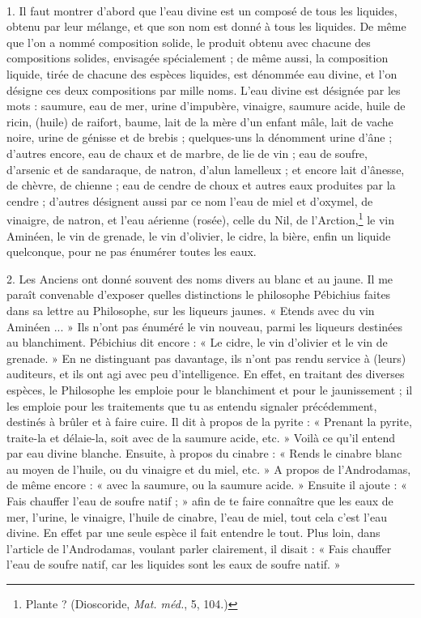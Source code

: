 \documentclass[landscape, a4paper, 11pt, oneside, polutonikogreek, french]{article}
\begin{document}
\paragraph{}
1. Il faut montrer d'abord que l'eau divine est un composé de tous les liquides, obtenu par leur mélange, et que son nom est donné à tous les liquides. De même que l'on a nommé composition solide, le produit obtenu avec chacune des compositions solides, envisagée spécialement ; de même aussi, la composition liquide, tirée de chacune des espèces liquides, est dénommée eau divine, et l'on désigne ces deux compositions par mille noms. L'eau divine est désignée par les mots : saumure, eau de mer, urine d'impubère, vinaigre, saumure acide, huile de ricin, (huile) de raifort, baume, lait de la mère d'un enfant mâle, lait de vache noire, urine de génisse et de brebis ; quelques-uns la dénomment urine d'âne ; d'autres encore, eau de chaux et de marbre, de lie de vin ; eau de soufre, d'arsenic et de sandaraque, de natron, d'alun lamelleux ; et encore lait d'ânesse, de chèvre, de chienne ; eau de cendre de choux et autres eaux produites par la cendre ; d'autres désignent aussi par ce nom l'eau de miel et d'oxymel, de vinaigre, de natron, et l'eau aérienne (rosée), celle du Nil, de l'Arction,\footnote{Plante ? (Dioscoride, \emph{Mat. méd.}, 5, 104.)} le vin Aminéen, le vin de grenade, le vin d'olivier, le cidre, la bière, enfin un liquide quelconque, pour ne pas énumérer toutes les eaux.

2. Les Anciens ont donné souvent des noms divers au blanc et au jaune. Il me paraît convenable d'exposer quelles distinctions le philosophe Pébichius faites dans sa lettre au Philosophe, sur les liqueurs jaunes. « Etends avec du vin Aminéen ... » Ils n'ont pas énuméré le vin nouveau, parmi les liqueurs destinées au blanchiment. Pébichius dit encore : « Le cidre, le vin d'olivier et le vin de grenade. » En ne distinguant pas davantage, ils n'ont pas rendu service à (leurs) auditeurs, et ils ont agi avec peu d'intelligence. En effet, en traitant des diverses espèces, le Philosophe les emploie pour le blanchiment et pour le jaunissement ; il les emploie pour les traitements que tu as entendu signaler précédemment, destinés à brûler et à faire cuire. Il dit à propos de la pyrite : « Prenant la pyrite, traite-la et délaie-la, soit avec de la saumure acide, etc. » Voilà ce qu'il entend par eau divine blanche. Ensuite, à propos du cinabre : « Rends le cinabre blanc au moyen de l'huile, ou du vinaigre et du miel, etc. » A propos de l'Androdamas, de même encore : « avec la saumure, ou la saumure acide. » Ensuite il ajoute : « Fais chauffer l'eau de soufre natif ; » afin de te faire connaître que les eaux de mer, l'urine, le vinaigre, l'huile de cinabre, l'eau de miel, tout cela c'est l'eau divine. En effet par une seule espèce il fait entendre le tout. Plus loin, dans l'article de l'Androdamas, voulant parler clairement, il disait : « Fais chauffer l'eau de soufre natif, car les liquides sont les eaux de soufre natif. »
\end{document}
